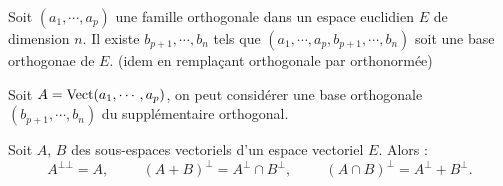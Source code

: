\begin{prop}
 Soit $(a_1,\cdots,a_p)$ une famille orthogonale dans un espace euclidien $E$ de dimension $n$. Il existe $b_{p+1},\cdots,b_n$ tels que $(a_1,\cdots,a_p,b_{p+1},\cdots,b_n)$ soit une base orthogonae de $E$. (idem en remplaçant orthogonale par orthonormée)
\end{prop}
\begin{demo}
 Soit $A=\mathop{\mathrm{Vect}}(a_1,\cdots,a_p)$, on peut considérer une base orthogonale $(b_{p+1},\cdots,b_n)$ du supplémentaire orthogonal.
\end{demo}
\begin{prop}
 Soit $A$, $B$ des sous-espaces vectoriels d'un espace vectoriel $E$. Alors :
\begin{displaymath}
 A^{\bot \bot}=A ,\hspace{1cm} (A+B)^\bot = A^\bot \cap B^\bot, \hspace{1cm} (A\cap B)^\bot = A^\bot + B^\bot .
\end{displaymath}
\end{prop}

